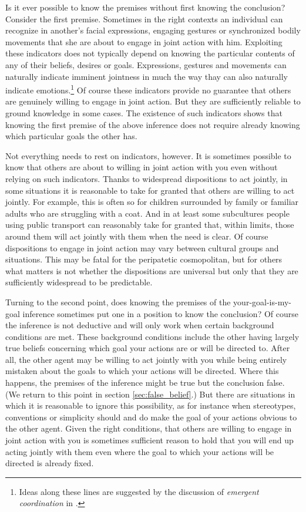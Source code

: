 \documentclass[14pt,a4paper]{extarticle}
\begin{document}
Is it ever possible to know the premises without first knowing the conclusion?  
Consider the first premise.  
Sometimes 
in the right contexts
an individual can recognize in another's facial expressions, engaging gestures or synchronized bodily movements that she are about to engage in joint action with him.
Exploiting these indicators does not typically depend on knowing the particular contents of any of their beliefs, desires or goals.  
Expressions, gestures and movements can naturally indicate imminent jointness in much the way thay can also naturally indicate emotions.\footnote{
Ideas along these lines are suggested by the discussion of \emph{emergent coordination} in \citet{Knoblich:2010fk}.
}  
Of course these indicators provide no guarantee that others are genuinely willing to engage in joint action.  
But they are sufficiently reliable to ground knowledge in some cases.  
The existence of such indicators shows that knowing the first  premise of the above inference does not require already knowing which particular goals the other has.  

Not everything needs to rest on indicators, however.
It is sometimes possible to know that others are about to willing in joint action with you even without relying on such indicators.  
Thanks to widespread dispositions to act jointly, in some situations it is reasonable to take for granted that others are willing to act jointly.  
For example, this is often so for children surrounded by family or familiar adults who are struggling with a coat.  
And in at least some subcultures people using public transport can reasonably take for granted that, within limits, those around them will act jointly with them when the need is clear.
Of course dispositions to engage in joint action may vary between cultural groups and situations.
This may be fatal for the peripatetic cosmopolitan,
but for others what matters is not whether the dispositions are universal but only that they are sufficiently widespread to be predictable.

Turning to the second point,
does knowing the premises of the your-goal-is-my-goal inference sometimes put one in a position to know the conclusion?  
Of course the inference is not deductive and will only work when certain background conditions are met.  
These background conditions include the other having largely true beliefs concerning which goal your actions are or will be directed to.
After all, the other agent may be willing to act jointly with you while being entirely mistaken about the goals to which your actions will be directed.
Where this happens, the premises of the inference might be true but the conclusion false.
(We return to this point in section \vref{sec:false_belief}.)  
But there are situations in which it is reasonable  to ignore  this possibility, as for instance when stereotypes, conventions or simplicity should and do make the goal of your actions obvious to the other agent.
Given the right conditions,
that others are willing to engage in joint action with you 
is sometimes sufficient reason to hold that
you will end up acting jointly with them
 even where the goal to which your actions will be directed is already fixed.
\end{document}
